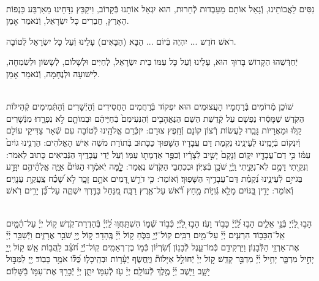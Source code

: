\documentclass[twoside, openany, parskip=half, 11pt]{book}
\begin{document}
\\
נִסִּים לַאֲבוֹתֵינוּ, וְֿגָאַל אוֹתָם מֵעַבְדוּת לְֿחֵרוּת, הוּא יִגְאַל אוֹתָנוּ בְּֿקָרוֹב, וִיקַבֵּץ נִדָּחֵינוּ מֵאַרְבַּע כַּנְפוֹת הָאָרֶץ, חֲבֵרִים כָּל יִשְׂרָאֵל, וְֿנֹאמַר אָמֵן.

רֹאשׁ חֹדֶש ... יִהְיֶה בְּֿיוֹם ... הַבָּא (הַבָּאִים) עָלֵינוּ וְֿעַל כָּל יִשְׂרָאֵל לְֿטוֹבָה.

יְֿחַדְּֿשֵׁהוּ הַקָּדוֹשׁ בָּרוּךְ הוּא, עָלֵינוּ וְֿעַל כָּל עַמּוֹ בֵּית יִשְׂרָאֵל, לְֿחַיִּים וּלְשָׁלוֹם, לְֿשָׂשׂוֹן וּלְשִׂמְחָה, לִישׁוּעָה וּלְנֶחָמָה, וְֿנֹאמַר אָמֵן.

\sepline

\vspace{-0.5\baselineskip}
\ashrei

\begin{sometimes}

\\
שׁוֹכֵן מְֿרוֹמִים בְּֿרַחֲמָיו הָעֲצוּמִים הוּא יִפְקוֹד בְּֿרַחֲמִים הַחֲסִידִים וְֿהַיְֿשָׁרִים וְֿהַתְּֿמִימִים קְֿהִילּוֹת הַקֹּֽדֶשׁ שֶׁמָּסְֿרוּ נַפְשָׁם עַל קְֿדֻשַּׁת הַשֵּׁם הַנֶּאֱהָבִ֤ים וְֿהַנְּעִימִם֙ בְּֿחַיֵּיהֶ֔ם וּבְמוֹתָ֖ם לֹ֣א נִפְרָ֑דוּ׃ מִנְּֿשָׁרִים קַֽלּוּ וּמֵאֲרָיוֹת גָּבֵֽרוּ לַעֲשׂוֹת רְֿצוֹן קוֹנָם וְֿחֵֽפֶץ צוּרָם: יִזְכְּֿרֵם אֱלֹהֵֽינוּ לְֿטוֹבָה עִם שְֿׁאָר צַדִּיקֵי עוֹלָם וְֿיִנְקוֹם בְּֿיָמֵֽינוּ לְֿעֵינֵֽינוּ נִקְמַת דַּם עֲבָדָיו הַשָּׁפוּךְ כַּכָּתוּב בְּֿתוֹרַת מֹשֶׁה אִישׁ הָאֱלֹהִים: הַרְנִ֤ינוּ גוֹיִם֙ עַמּ֔וֹ כִּ֥י דַם־עֲבָדָ֖יו יִקּ֑וֹם וְֿנָקָם֙ יָשִׁ֣יב לְֿצָרָ֔יו וְֿכִפֶּ֥ר אַדְמָת֖וֹ עַמּֽוֹ׃ וְֿעַל יְֿדֵי עֲבָדֶֽיךָ הַנְּֿבִיאִים כָּתוּב לֵאמֹר: וְנִקֵּ֖יתִי דָּמָ֣ם לֹֽא־נִקֵּ֑יתִי וַֽיְֿיָ֖ שֹׁכֵ֥ן בְּֿצִיּֽוֹן׃ וּבְכִתְבֵי הַקֹּֽדֶשׁ נֶאֱמַר: לׇׇׇָ֤מָּה יֹֽאמְֿר֣וּ הַגּוֹיִם֘ אַיֵּ֢ה אֱלֹֽהֵ֫יהֶ֥ם יִוָּדַ֣ע בַּגֹּייִ֣ם לְֿעֵינֵ֑ינוּ נִ֝קְמַ֗ת דַּם־עֲבָדֶ֥יךָ הַשָּׁפֽוּךְ׃ וְֿאוֹמֵר: כִּ֤י דֹרֵ֣שׁ דָּ֭מִים אֹתָ֣ם זָכָ֑ר לֹ֥א שָׁ֝כַ֗ח צַֽעֲקַ֥ת עֲנָוִֽים׃ וְֿאוֹמֵר: יָדִ֣ין בַּ֭גּוֹיִם מָלֵ֣א גְֿוִיּ֑וֹת מָ֥חַץ רֹ֝֗אשׁ עַל־אֶ֥רֶץ רַבָּֽה׃ מִ֭נַּחַל בַּדֶּ֣רֶךְ יִשְׁתֶּ֑ה עַל־כֵּ֝֗ן יָרִ֥ים רֹֽאשׁ׃

\end{sometimes}


\yehalelu

\\
%
הָב֣וּ לַ֭יְֿיָ בְּֿנֵ֣י אֵלִ֑ים הָב֥וּ לַֽ֝יְֿיָ֗ כָּב֥וֹד וָעֹֽז׃
הָב֣וּ לַ֭יְֿיָ כְּֿב֣וֹד שְֿׁמ֑וֹ הִשְׁתַּֽחֲו֥וּ לַֽ֝יְֿיָ֗ בְּֿהַדְרַת־קֹֽדֶשׁ׃
ק֥וֹל יְיָ֗ עַל־הַ֫מָּ֥יִם אֵֽל־הַכָּב֥וֹד הִרְעִ֑ים יְ֜יָ֗ עַל־מַ֥יִם רַבִּֽים׃
קֽוֹל־יְֿיָ֥ בַּכֹּ֑חַ ק֥וֹל יְ֜יָ֗ בֶּֽהָדָר׃
ק֣וֹל יְ֖יָ֥ שֹׁבֵ֣ר אֲרָזִ֑ים וַיְֿשַׁבֵּ֥ר יְ֜יָ֗ אֶת־אַרְזֵ֥י הַלְּֿבָנֽוֹן׃
וַיַּרְקִידֵ֥ם כְּֿמוֹ־עֵ֑גֶל לְֿבָנ֥וֹן וְֿ֝שִׂרְי֗וֹן כְּֿמ֣וֹ בֶן־רְאֵמִֽים׃
קֽוֹל־יְֿיָ֥ חֹ֝צֵ֗ב לַֽהֲב֥וֹת אֵֽשׁ׃
ק֣וֹל יְ֖יָ֥ יָחִ֣יל מִדְבָּ֑ר יָחִ֥יל יְ֜יָ֗ מִדְבַּ֣ר קָדֵֽשׁ׃
ק֣וֹל יְיָ֙ יְֿחוֹלֵ֣ל אַיָּלוֹת֘ וַיֶּֽחֱשׂ֢ף יְֿעָ֫ר֥וֹת וּבְהֵֽיכָל֑וֹ כֻּ֝לּ֗וֹ אֹמֵ֥ר כָּבֽוֹד׃
יְ֖יָ לַמַּבּ֣וּל יָשָׁ֑ב וַיֵּ֥שֶׁב יְ֜יָ֗ מֶ֣לֶךְ לְֿעוֹלָֽם׃
יְיָ֗ עֹ֖ז לְֿעַמּ֣וֹ יִתֵּ֑ן יְיָ֓ יְֿבָרֵ֖ךְ אֶת־עַמּ֣וֹ בַֿשָּׁלֽוֹם׃
\end{document}
